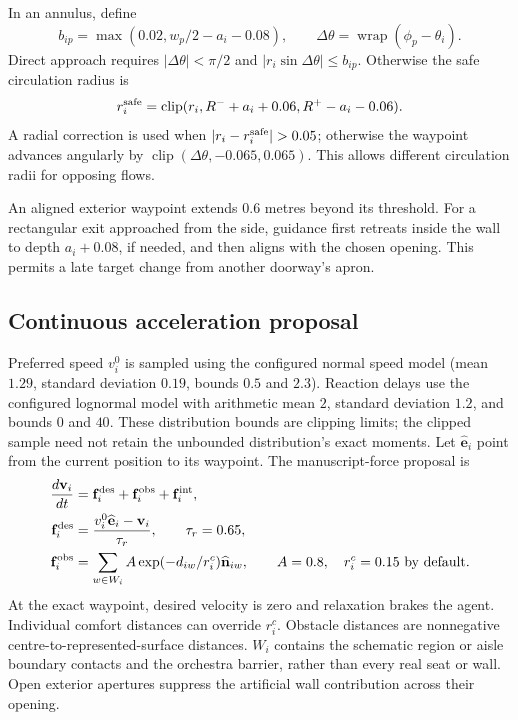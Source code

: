 \documentclass[11pt]{article}
\newcommand{\clip}{\operatorname{clip}}
\newcommand{\wrap}{\operatorname{wrap}}
\begin{document}
In an annulus, define
\[
 b_{ip}=\max(0.02,w_p/2-a_i-0.08),\qquad
 \Delta\theta=\wrap(\phi_p-\theta_i).
\]
Direct approach requires $|\Delta\theta|<\pi/2$ and
$|r_i\sin\Delta\theta|\leq b_{ip}$. Otherwise the safe circulation radius is
\[
 r_i^{\rm safe}=\clip(r_i,R^-+a_i+0.06,R^+-a_i-0.06).
\]
A radial correction is used when $|r_i-r_i^{\rm safe}|>0.05$; otherwise the
waypoint advances angularly by $\clip(\Delta\theta,-0.065,0.065)$.
This allows different circulation radii for opposing flows.

An aligned exterior waypoint extends $0.6$ metres beyond its threshold.
For a rectangular exit approached from the side, guidance first retreats
inside the wall to depth $a_i+0.08$, if needed, and then aligns with the chosen
opening. This permits a late target change from another doorway's apron.

\subsection{Continuous acceleration proposal}

Preferred speed $v_i^0$ is sampled using the configured normal speed model
(mean $1.29$, standard deviation $0.19$, bounds $0.5$ and $2.3$).
Reaction delays use the configured lognormal model with arithmetic mean $2$,
standard deviation $1.2$, and bounds $0$ and $40$. These distribution bounds
are clipping limits; the clipped sample need not retain the unbounded
distribution's exact moments.
Let $\widehat{\mathbf e}_i$ point from the current position to its waypoint.
The manuscript-force proposal is
\begin{align}
 \frac{d\mathbf v_i}{dt}
   &=\mathbf f_i^{\rm des}+\mathbf f_i^{\rm obs}+\mathbf f_i^{\rm int},\\
 \mathbf f_i^{\rm des}
   &=\frac{v_i^0\widehat{\mathbf e}_i-\mathbf v_i}{\tau_r},
      \qquad\tau_r=0.65,\\
 \mathbf f_i^{\rm obs}
   &=\sum_{w\in W_i}A\exp(-d_{iw}/r_i^c)\widehat{\mathbf n}_{iw},
      \qquad A=0.8,\quad r_i^c=0.15\text{ by default}.
\end{align}
At the exact waypoint, desired velocity is zero and relaxation brakes the
agent. Individual comfort distances can override $r_i^c$. Obstacle distances
are nonnegative centre-to-represented-surface distances. $W_i$ contains the
schematic region or aisle boundary contacts and the orchestra barrier, rather
than every real seat or wall. Open exterior apertures suppress the artificial
wall contribution across their opening.
\end{document}
